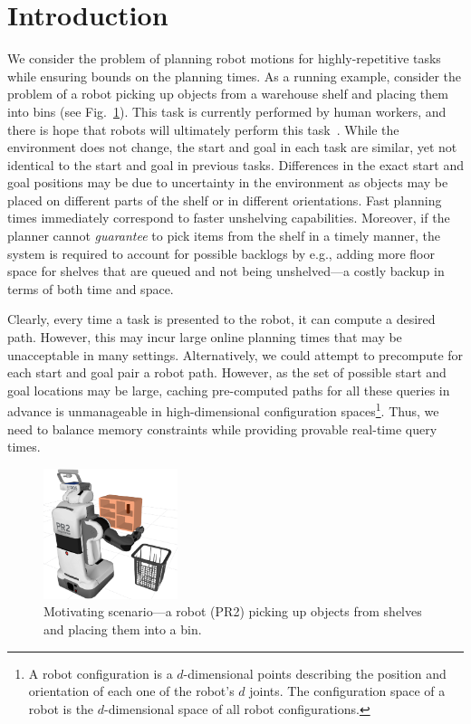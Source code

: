 \documentclass[letterpaper]{article} %
\begin{document}
\section{Introduction}
We consider the problem of planning robot motions for highly-repetitive tasks while ensuring bounds on the planning times.
As a running example, consider the problem of a robot picking up objects from a warehouse shelf and placing them into bins (see Fig.~\ref{fig:PR2}). This task is currently performed by human workers, and there is hope that robots will ultimately perform this task~\cite{correll2018analysis}.
While the environment does not change, the start and goal in each task are similar, yet not identical to the start and goal in previous tasks.
Differences in the exact start and goal positions may be due to uncertainty in the environment as objects may be placed on different parts of the shelf or in different orientations.
Fast planning times immediately correspond to faster unshelving capabilities. 
Moreover, if the planner cannot \emph{guarantee} to pick items from the shelf in a timely manner, the system is required to account for possible backlogs by e.g., adding more floor space for shelves that are queued and not being unshelved---a costly backup in terms of both time and space.

Clearly, every time a task is presented to the robot, it can compute a desired path.
However, this may incur large online planning times that may be unacceptable in many settings.
%
Alternatively, we could attempt to precompute for each start and goal pair a robot path.
However, as the set of possible start and goal locations may be large, caching pre-computed paths for all these queries in advance is unmanageable in high-dimensional configuration spaces\footnote{
A robot configuration is a $d$-dimensional points describing the position and orientation of each one of the robot's $d$ joints.
The configuration space of a robot is the $d$-dimensional space of all robot configurations.}.
Thus, we need to balance memory constraints while providing provable real-time query times.

\begin{figure}[tb]
  \centering
    \includegraphics[width=0.35\textwidth]{PR2.png}
  \caption{
  Motivating scenario---a robot (PR2) picking up objects from shelves and placing them into a bin.
}
    \label{fig:PR2}
\end{figure}
\end{document}
